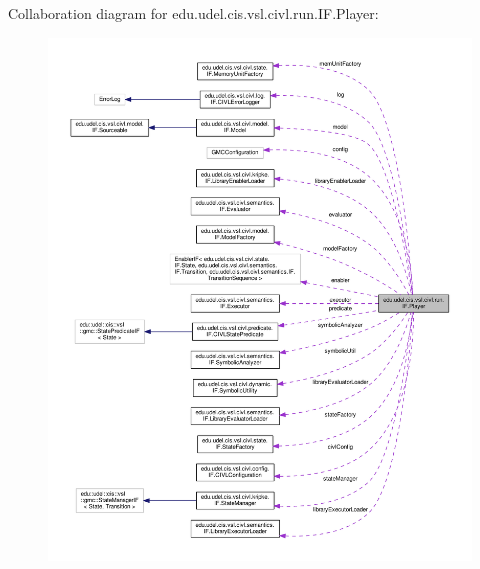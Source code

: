 Collaboration diagram for edu.\+udel.\+cis.\+vsl.\+civl.\+run.\+I\+F.\+Player\+:
\nopagebreak
\begin{figure}[H]
\begin{center}
\leavevmode
\includegraphics[width=350pt]{classedu_1_1udel_1_1cis_1_1vsl_1_1civl_1_1run_1_1IF_1_1Player__coll__graph}
\end{center}
\end{figure}

